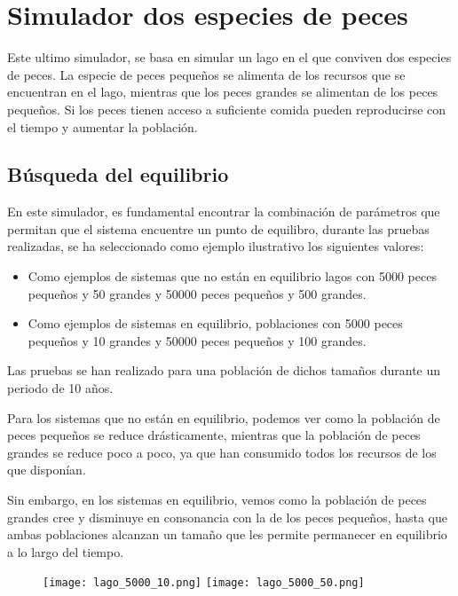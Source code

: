 \chapter{Simulador dos especies de peces}
Este ultimo simulador, se basa en simular un lago en el que conviven dos especies de peces. La especie de peces pequeños se alimenta de los recursos que se encuentran en el lago, mientras que los peces grandes se alimentan de los peces pequeños. Si los peces tienen acceso a suficiente comida pueden reproducirse con el tiempo y aumentar la población.

\section{Búsqueda del equilibrio}
En este simulador, es fundamental encontrar la combinación de parámetros que permitan que el sistema encuentre un punto de equilibro, durante las pruebas realizadas, se ha seleccionado como ejemplo ilustrativo los siguientes valores:

\begin{itemize}
	\item Como ejemplos de sistemas que no están en equilibrio lagos con 5000 peces pequeños y 50 grandes y 50000 peces pequeños y 500 grandes.
	\item Como ejemplos de sistemas en equilibrio, poblaciones con 5000 peces pequeños y 10 grandes y 50000 peces pequeños y 100 grandes.
\end{itemize}

Las pruebas se han realizado para una población de dichos tamaños durante un periodo de 10 años.

Para los sistemas que no están en equilibrio, podemos ver como la población de peces pequeños se reduce drásticamente, mientras que la población de peces grandes se reduce poco a poco, ya que han consumido todos los recursos de los que disponían.

Sin embargo, en los sistemas en equilibrio, vemos como la población de peces grandes cree y disminuye en consonancia con la de los peces pequeños, hasta que ambas poblaciones alcanzan un tamaño que les permite permanecer en equilibrio a lo largo del tiempo.

\newpage
\newpage

\begin{figure}[h!]
\texttt{[image: lago\_5000\_10.png]}
\texttt{[image: lago\_5000\_50.png]}
\centering
\end{figure}

